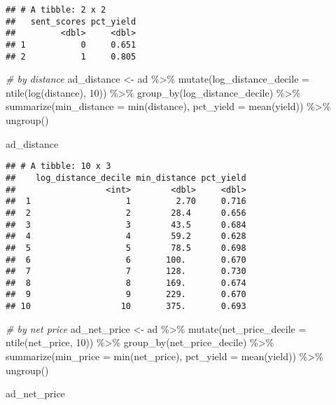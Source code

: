 \documentclass[
]{article}
\newenvironment{Shaded}{\begin{snugshade}}{\end{snugshade}}
\newcommand{\AttributeTok}[1]{\textcolor[rgb]{0.77,0.63,0.00}{#1}}
\newcommand{\CommentTok}[1]{\textcolor[rgb]{0.56,0.35,0.01}{\textit{#1}}}
\newcommand{\DecValTok}[1]{\textcolor[rgb]{0.00,0.00,0.81}{#1}}
\newcommand{\FunctionTok}[1]{\textcolor[rgb]{0.00,0.00,0.00}{#1}}
\newcommand{\NormalTok}[1]{#1}
\newcommand{\OtherTok}[1]{\textcolor[rgb]{0.56,0.35,0.01}{#1}}
\newcommand{\SpecialCharTok}[1]{\textcolor[rgb]{0.00,0.00,0.00}{#1}}
\begin{document}
\begin{verbatim}
## # A tibble: 2 x 2
##   sent_scores pct_yield
##         <dbl>     <dbl>
## 1           0     0.651
## 2           1     0.805
\end{verbatim}

\begin{Shaded}
\begin{Highlighting}[]
\CommentTok{\# by distance}
\NormalTok{ad\_distance }\OtherTok{\textless{}{-}}\NormalTok{ ad }\SpecialCharTok{\%\textgreater{}\%}
  \FunctionTok{mutate}\NormalTok{(}\AttributeTok{log\_distance\_decile =} \FunctionTok{ntile}\NormalTok{(}\FunctionTok{log}\NormalTok{(distance), }\DecValTok{10}\NormalTok{)) }\SpecialCharTok{\%\textgreater{}\%}
  \FunctionTok{group\_by}\NormalTok{(log\_distance\_decile) }\SpecialCharTok{\%\textgreater{}\%}
  \FunctionTok{summarize}\NormalTok{(}\AttributeTok{min\_distance =} \FunctionTok{min}\NormalTok{(distance),}
            \AttributeTok{pct\_yield =} \FunctionTok{mean}\NormalTok{(yield)) }\SpecialCharTok{\%\textgreater{}\%}
  \FunctionTok{ungroup}\NormalTok{()}

\NormalTok{ad\_distance}
\end{Highlighting}
\end{Shaded}

\begin{verbatim}
## # A tibble: 10 x 3
##    log_distance_decile min_distance pct_yield
##                  <int>        <dbl>     <dbl>
##  1                   1         2.70     0.716
##  2                   2        28.4      0.656
##  3                   3        43.5      0.684
##  4                   4        59.2      0.628
##  5                   5        78.5      0.698
##  6                   6       100.       0.670
##  7                   7       128.       0.730
##  8                   8       169.       0.674
##  9                   9       229.       0.670
## 10                  10       375.       0.693
\end{verbatim}

\begin{Shaded}
\begin{Highlighting}[]
\CommentTok{\# by net price}
\NormalTok{ad\_net\_price }\OtherTok{\textless{}{-}}\NormalTok{ ad }\SpecialCharTok{\%\textgreater{}\%}
  \FunctionTok{mutate}\NormalTok{(}\AttributeTok{net\_price\_decile =} \FunctionTok{ntile}\NormalTok{(net\_price, }\DecValTok{10}\NormalTok{)) }\SpecialCharTok{\%\textgreater{}\%}
  \FunctionTok{group\_by}\NormalTok{(net\_price\_decile) }\SpecialCharTok{\%\textgreater{}\%}
  \FunctionTok{summarize}\NormalTok{(}\AttributeTok{min\_price =} \FunctionTok{min}\NormalTok{(net\_price),}
            \AttributeTok{pct\_yield =} \FunctionTok{mean}\NormalTok{(yield)) }\SpecialCharTok{\%\textgreater{}\%}
  \FunctionTok{ungroup}\NormalTok{()}

\NormalTok{ad\_net\_price}
\end{Highlighting}
\end{Shaded}
\end{document}
